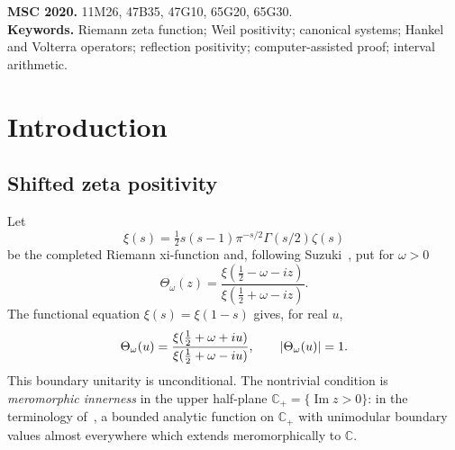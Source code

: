 \documentclass[11pt,a4paper]{article}
\newcommand{\C}{\mathbb C}
\newcommand{\Cp}{\mathbb C_+}
\renewcommand{\Im}{\operatorname{Im}}
\DeclarePairedDelimiter{\abs}{\lvert}{\rvert}
\theoremstyle{plain}
\theoremstyle{definition}
\numberwithin{equation}{section}
\begin{document}
\medskip
\noindent\textbf{MSC 2020.} 11M26, 47B35, 47G10, 65G20, 65G30.\\
\textbf{Keywords.} Riemann zeta function; Weil positivity; canonical systems;
Hankel and Volterra operators; reflection positivity; computer-assisted proof;
interval arithmetic.

\setcounter{tocdepth}{1}
\tableofcontents

\section{Introduction}

\subsection{Shifted zeta positivity}

Let
\begin{equation}
\xi(s)=\tfrac12 s(s-1)\pi^{-s/2}\Gamma(s/2)\zeta(s)
\end{equation}
be the completed Riemann xi-function and, following Suzuki~\cite{Suzuki2012},
put for $\omega>0$
\begin{equation}\label{eq:Theta}
\Theta_\omega(z)=\frac{\xi(\tfrac12-\omega-iz)}{\xi(\tfrac12+\omega-iz)}.
\end{equation}
The functional equation $\xi(s)=\xi(1-s)$ gives, for real $u$,
\begin{equation}
\Theta_\omega(u)=\frac{\xi(\tfrac12+\omega+iu)}{\xi(\tfrac12+\omega-iu)},
\qquad \abs{\Theta_\omega(u)}=1 .
\end{equation}
This boundary unitarity is unconditional. The nontrivial condition is
\emph{meromorphic innerness} in the upper half-plane
$\Cp=\{\Im z>0\}$: in the terminology of~\cite{Suzuki2012}, a bounded
analytic function on $\Cp$ with unimodular boundary values almost everywhere
which extends meromorphically to $\C$.
\end{document}
